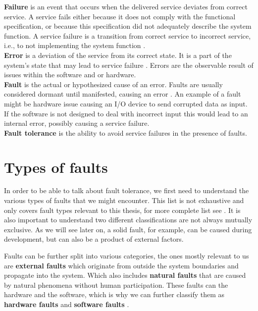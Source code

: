 \documentclass[12pt, letterpaper]{article}
\begin{document}
\textbf{Failure} is an event that occurs when the delivered service deviates from correct service. A service fails either because it does not comply with the functional specification, or because this specification did not adequately describe the system function. A service failure is a transition from correct service to incorrect service, i.e., to not implementing the system function \cite{1335465}. \\

\textbf{Error} is a deviation of the service from its correct state. It is a part of the system's state that may lead to service failure \cite{1335465}. Errors are the observable result of issues within the software and or hardware. \\

\textbf{Fault} is the actual or hypothesized cause of an error. Faults are usually considered dormant until manifested, causing an error \cite{1335465}. An example of a fault might be hardware issue causing an I/O device to send corrupted data as input. If the software is not designed to deal with incorrect input this would lead to an internal error, possibly causing a service failure. \\

\textbf{Fault tolerance} is the ability to avoid service failures in the presence of faults. 

\section{Types of faults}

In order to be able to talk about fault tolerance, we first need to understand the various types of faults that we might encounter. This list is not exhaustive and only covers fault types relevant to this thesis, for more complete list see \cite{1335465}. It is also important to understand two different classifications are not always mutually exclusive. As we will see later on, a solid fault, for example, can be caused during development, but can also be a product of external factors.

Faults can be further split into various categories, the ones mostly relevant to us are \textbf{external faults} which originate from outside the system boundaries and propagate into the system. Which also includes \textbf{natural faults} that are caused by natural phenomena without human participation. These faults can the hardware and the software, which is why we can further classify them as \textbf{hardware faults} and \textbf{software faults} \cite{1335465}. \\
\end{document}
